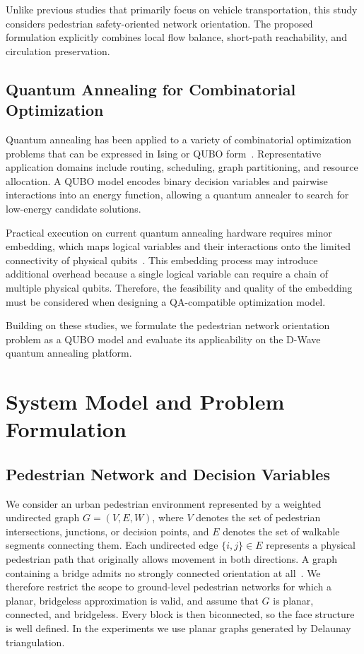 \documentclass[twocolumn,a4paper]{article}
\begin{document}
Unlike previous studies that primarily focus on vehicle transportation, this study considers pedestrian safety-oriented network orientation. The proposed formulation explicitly combines local flow balance, short-path reachability, and circulation preservation.

\subsection{Quantum Annealing for Combinatorial Optimization} \label{subsec:related_qa}

Quantum annealing has been applied to a variety of combinatorial optimization problems that can be expressed in Ising or QUBO form~\cite{qa_for_optimize}. Representative application domains include routing, scheduling, graph partitioning, and resource allocation. A QUBO model encodes binary decision variables and pairwise interactions into an energy function, allowing a quantum annealer to search for low-energy candidate solutions.

Practical execution on current quantum annealing hardware requires minor embedding, which maps logical variables and their interactions onto the limited connectivity of physical qubits~\cite{minor_embedding_inQA2, minor_embedding_inQA}. This embedding process may introduce additional overhead because a single logical variable can require a chain of multiple physical qubits. Therefore, the feasibility and quality of the embedding must be considered when designing a QA-compatible optimization model.

Building on these studies, we formulate the pedestrian network orientation problem as a QUBO model and evaluate its applicability on the D-Wave quantum annealing platform.

\section{System Model and Problem Formulation} \label{sec:model}

\subsection{Pedestrian Network and Decision Variables} \label{subsec:model_graph}

We consider an urban pedestrian environment represented by a weighted undirected graph $G=(V,E,W)$, where \(V\) denotes the set of pedestrian intersections, junctions, or decision points, and \(E\) denotes the set of walkable segments connecting them. Each undirected edge \(\{i,j\}\in E\) represents a physical pedestrian path that originally allows movement in both directions. A graph containing a bridge admits no strongly connected orientation at all~\cite{robbins1939theorem}. We therefore restrict the scope to ground-level pedestrian networks for which a planar, bridgeless approximation is valid, and assume that \(G\) is planar, connected, and bridgeless. Every block is then biconnected, so the face structure is well defined. In the experiments we use planar graphs generated by Delaunay triangulation.
\end{document}
